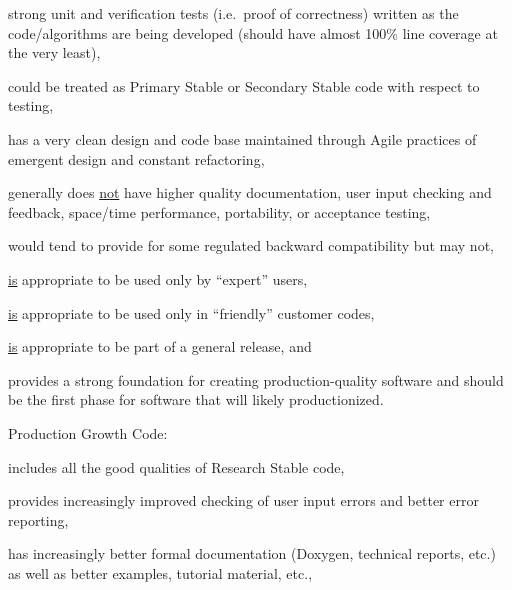\documentclass[11pt]{SANDreport}
\begin{document}
\begin{compactenum}
\begin{compactitem}
{}\item strong unit and verification tests (i.e.\ proof of
correctness) written as the code/algorithms are being developed
(should have almost 100\% line coverage at the very least),

{}\item could be treated as Primary Stable or Secondary Stable code
with respect to testing,

{}\item has a very clean design and code base maintained through Agile
practices of emergent design and constant refactoring,

{}\item generally does {}\underline{not} have higher quality
documentation, user input checking and feedback, space/time
performance, portability, or acceptance testing,

{}\item would tend to provide for some regulated backward
compatibility but may not,

{}\item {}\underline{is} appropriate to be used only by ``expert''
users,

{}\item {}\underline{is} appropriate to be used only in ``friendly''
customer codes,

{}\item {}\underline{is} appropriate to be part of a general release,
and

{}\item provides a strong foundation for creating production-quality
software and should be the first phase for software that will likely
productionized.

\end{compactitem}

{}\item Production Growth Code:

\begin{compactitem}

{}\item includes all the good qualities of Research Stable code,

{}\item provides increasingly improved checking of user input errors
and better error reporting,

{}\item has increasingly better formal documentation (Doxygen,
technical reports, etc.) as well as better examples, tutorial
material, etc.,


\end{compactitem}
\end{compactenum}
\end{document}
